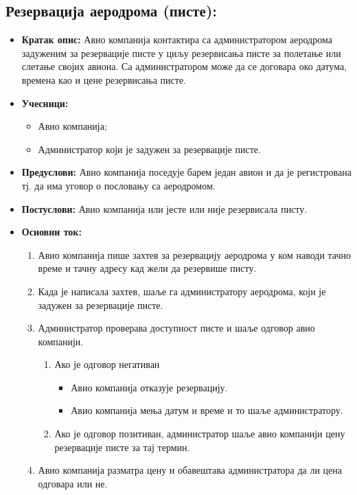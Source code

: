 \documentclass{article}
\begin{document}
\subsection{Резервација аеродрома (писте):}
\begin{itemize}
\item \textbf{Кратак опис:} Авио компанија контактира са администратором аеродрома задуженим за резервације писте у циљу резервисања писте за полетање или слетање својих авиона. Са администратором може да се договара око датума, времена као и цене резервисања писте.
\item \textbf{Учесници:}
\begin{itemize}
    \item Авио компанија;
    \item Администратор који је задужен за резервације писте.
\end{itemize}
 \item \textbf{Предуслови:} Авио компанија поседује барем један авион и да је регистрована тј. да има уговор о пословању са аеродромом.
 \item \textbf{Постуслови:} Авио компанија или јесте или није резервисала писту.
 \item \textbf{Основни ток:}
 \begin{enumerate}
    \item Авио компанија пише захтев за резервацију аеродрома у ком наводи тачно време и тачну адресу кад жели да резервише писту.
    \item Када је написала захтев, шаље га администратору аеродрома, који је задужен за резервације писте.
    \item Администратор проверава доступност писте и шаље одговор авио компанији.
    \begin{enumerate}
        \item Ако је одговор негативан
        \begin{itemize}
            \item Авио компанија отказује резервацију.
            \item Авио компанија мења датум и време и то шаље администратору.
        \end{itemize}
        \item Ако је одговор позитиван, администратор шаље авио компанији цену резервације писте за тај термин.
    \end{enumerate}
    \item Авио компанија разматра цену и обавештава администратора да ли цена одговара или не.

\end{enumerate}
\end{itemize}
\end{document}
